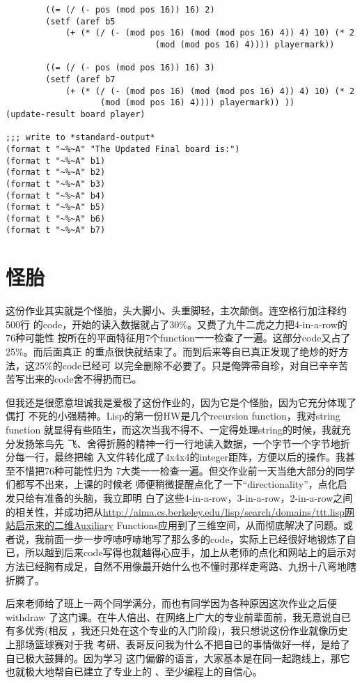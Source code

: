 \documentclass[12pt]{book}
\begin{document}
\begin{lstlisting}
        ((= (/ (- pos (mod pos 16)) 16) 2) 
        (setf (aref b5
            (+ (* (/ (- (mod pos 16) (mod (mod pos 16) 4)) 4) 10) (* 2 
                              (mod (mod pos 16) 4)))) playermark))

        ((= (/ (- pos (mod pos 16)) 16) 3) 
        (setf (aref b7 
            (+ (* (/ (- (mod pos 16) (mod (mod pos 16) 4)) 4) 10) (* 2 
                   (mod (mod pos 16) 4)))) playermark)) ))
(update-result board player)

;;; write to *standard-output*
(format t "~%~A" "The Updated Final board is:")
(format t "~%~A" b1)
(format t "~%~A" b2)
(format t "~%~A" b3)
(format t "~%~A" b4)
(format t "~%~A" b5)
(format t "~%~A" b6)
(format t "~%~A" b7)
\end{lstlisting}
\section{怪胎}
\label{sec-12-11}

这份作业其实就是个怪胎，头大脚小、头重脚轻，主次颠倒。连空格行加注释约500行
的code，开始的读入数据就占了30\%。又费了九牛二虎之力把4-in-a-row的76种可能性
按所在的平面特征用7个function一一检查了一遍。这部分code又占了25\%。而后面真正
的重点很快就结束了。而到后来等自已真正发现了绝炒的好方法，这25\%的code已经可
以完全删除不必要了。只是俺弊帚自珍，对自已辛辛苦苦写出来的code舍不得扔而已。

但我还是很愿意坦诚我是爱极了这份作业的，因为它是个怪胎，因为它充分体现了偶打
不死的小强精神。Lisp的第一份HW是几个recursion function，我对string function
就显得有些陌生，而这次当我不得不、一定得处理string的时候，我就充分发扬笨鸟先
飞、舍得折腾的精神一行一行地读入数据，一个字节一个字节地折分每一行，最终把输
入文件转化成了4x4x4的integer距阵，方便以后的操作。我甚至不惜把76种可能性归为
7大类一一检查一遍。但交作业前一天当绝大部分的同学们都写不出来，上课的时候老
师便稍微提醒点化了一下“directionality”，点化启发只给有准备的头脑，我立即明
白了这些4-in-a-row，3-in-a-row，2-in-a-row之间的相关性，并成功把从\url{http://aima.cs.berkeley.edu/lisp/search/domains/ttt.lisp网站启示来的二维Auxiliary} Functions应用到了三维空间，从而彻底解决了问题。或者说，我前面一步一步哼哧哼哧地写了那么多的code，实际上已经很好地锻炼了自已，所以越到后来code写得也就越得心应手，加上从老师的点化和网站上的启示对方法已经胸有成足，自然不用像最开始什么也不懂时那样走弯路、九拐十八弯地瞎折腾了。

后来老师给了班上一两个同学满分，而也有同学因为各种原因这次作业之后便withdraw
了这门课。在牛人倍出、在网络上广大的专业前辈面前，我无意说自已有多优秀(相反
，我还只处在这个专业的入门阶段)，我只想说这份作业就像历史上那场篮球赛对于我
考研、表哥反问我为什么不把自已的事情做好一样，是给了自已极大鼓舞的。因为学习
这门偏僻的语言，大家基本是在同一起跑线上，那它也就极大地帮自已建立了专业上的
、至少编程上的自信心。
\end{document}

